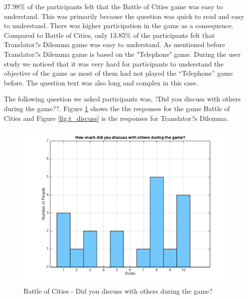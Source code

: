 \documentclass{sig-alternate}
\begin{document}
{37.98\% of the participants felt that the Battle of Cities game was easy to understand. This was primarily because the question was quick to read and easy to understand. There was higher participation in the game as a consequence.
Compared to Battle of Cities, only 13.85\% of the participants felt that Translator?s Dilemma game was easy to understand. As mentioned before Translator?s Dilemma game is based on the "Telephone" game. During the user study we noticed that it was very hard for participants to understand the objective of the game as most of them had not played the ``Telephone'' game before. The question text was also long and complex in this case.

The following question we asked participants was, ?Did you discuss with others during the game??. Figure \ref{fig:p_discuss} shows the the responses for the game Battle of Cities and Figure \ref{fig:t_discuss} is the responses for Translator?s Dilemma.

\begin{figure}
	\includegraphics[width=\linewidth]{p_discuss.png}
	\caption{Battle of Cities - Did you discuss with others during the game?}
	\label{fig:p_discuss}
\end{figure}

}
\end{document}
